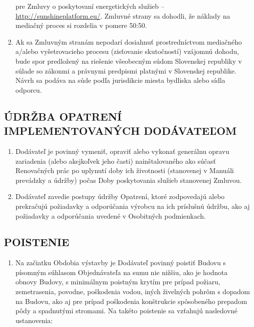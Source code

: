 \begin{multicols}{2}
\begin{enumerate}
  pre Zmluvy o poskytovaní energetických služieb
  --\href{http://www.sharex.lv}{http://sunshineplatform.eu/}. Zmluvné
  strany sa dohodli, že náklady na mediačný proces si rozdelia v pomere
  50:50.
\item
  Ak sa Zmluvným stranám nepodarí dosiahnuť prostredníctvom mediačného
  a/alebo vyšetrovacieho procesu (zisťovanie skutočností) vzájomnú
  dohodu, bude spor predložený na riešenie všeobecným súdom Slovenskej
  republiky v súlade so zákonmi a právnymi predpismi platnými v
  Slovenskej republike. Návrh sa podáva na súde podľa jurisdikcie miesta
  bydliska alebo sídla odporcu.
\end{enumerate}

\subsection{ÚDRŽBA OPATRENÍ IMPLEMENTOVANÝCH DODÁVATEĽOM}

\begin{enumerate}
\def\labelenumi{\arabic{enumi}.}
\item
  Dodávateľ je povinný vymeniť, opraviť alebo vykonať generálnu opravu
  zariadenia (alebo akejkoľvek jeho časti) nainštalovaného ako súčasť
  Renovačných prác po uplynutí doby ich životnosti (stanovenej v Manuáli
  prevádzky a údržby) počas Doby poskytovania služieb stanovenej
  Zmluvou.
\item
  Dodávateľ zavedie postupy údržby Opatrení, ktoré zodpovedajú alebo
  prekračujú požiadavky a odporúčania výrobcu na ich príslušnú údržbu,
  ako aj požiadavky a odporúčania uvedené v Osobitných podmienkach.
\end{enumerate}

\subsection{POISTENIE}

\begin{enumerate}
\def\labelenumi{\arabic{enumi}.}
\item
  Na začiatku Obdobia výstavby je Dodávateľ povinný poistiť Budovu s
  písomným súhlasom Objednávateľa na sumu nie nižšiu, ako je hodnota
  obnovy Budovy, s minimálnym poistným krytím pre prípad požiaru,
  zemetrasenia, povodne, poškodenia vodou, iných živelných pohrôm s
  dopadom na Budovu, ako aj pre prípad poškodenia konštrukcie
  spôsobeného prepadom pôdy a spadnutými stromami. Na takéto poistenie
  sa vzťahujú nasledovné ustanovenia:


\end{enumerate}
\end{multicols}

